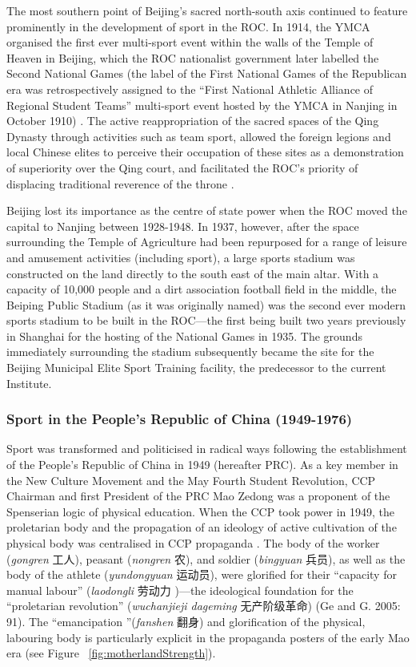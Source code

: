 {The most southern point of Beijing's sacred north-south axis continued to feature prominently in the development of sport in the ROC.  In 1914, the YMCA organised the first ever multi-sport event within the walls of the Temple of Heaven in Beijing, which the ROC nationalist government later labelled the Second National Games (the label of the First National Games of the Republican era was retrospectively assigned to the ``First National Athletic Alliance of Regional Student Teams'' multi-sport event hosted by the YMCA in Nanjing in October 1910) \citep[441]{Li2015}. The active reappropriation of the sacred spaces of the Qing Dynasty through activities such as team sport, allowed the foreign legions and local Chinese elites to perceive their occupation of these sites as a demonstration of superiority over the Qing court, and facilitated the ROC's priority of displacing traditional reverence of the throne \citep{Hevia1990}.

Beijing lost its importance as the centre of state power when the ROC moved the capital to Nanjing between 1928-1948.  In 1937, however, after the space surrounding the Temple of Agriculture had been repurposed for a range of leisure and amusement activities (including sport), a large sports stadium was constructed on the land directly to the south east of the main altar.  With a capacity of 10,000 people and a dirt association football field in the middle, the Beiping Public Stadium (as it was originally named) was the second ever modern sports stadium to be built in the ROC---the first being built two years previously in Shanghai for the hosting of the National Games in 1935.  The grounds immediately surrounding the stadium subsequently became the site for the Beijing Municipal Elite Sport Training facility, the predecessor to the current Institute.


\subsubsection{Sport in the People's Republic of China (1949-1976)}
Sport was transformed and politicised in radical ways following the establishment of the People’s Republic of China in 1949 (hereafter PRC).  As a key member in the New Culture Movement and the May Fourth Student Revolution, CCP Chairman and first President of the PRC Mao Zedong was a proponent of the Spenserian logic of physical education.  When the CCP took power in 1949, the proletarian body and the propagation of an ideology of active cultivation of the physical body was centralised in CCP propaganda \citep[58]{Brownell1995}.  The body of the worker (\textit{gongren} 工人), peasant (\textit{nongren} 农), and soldier (\textit{bingyuan} 兵员), as well as the body of the athlete (\textit{yundongyuan} 运动员), were glorified for their ``capacity for manual labour'' (\textit{laodongli} 劳动力 )---the ideological foundation for the ``proletarian revolution'' (\textit{wuchanjieji dageming} 无产阶级革命) (Ge and G. 2005: 91).  The ``emancipation ''(\textit{fanshen} 翻身) and glorification of the physical, labouring body is particularly explicit in the propaganda posters of the early Mao era \citep[87]{Ge2005} (see Figure ~\ref{fig:motherlandStrength}).

}
